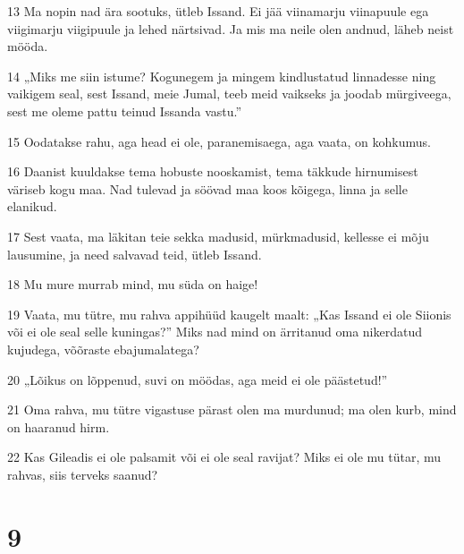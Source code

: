 \par 13 Ma nopin nad ära sootuks, ütleb Issand. Ei jää viinamarju viinapuule ega viigimarju viigipuule ja lehed närtsivad. Ja mis ma neile olen andnud, läheb neist mööda.
\par 14 „Miks me siin istume? Kogunegem ja mingem kindlustatud linnadesse ning vaikigem seal, sest Issand, meie Jumal, teeb meid vaikseks ja joodab mürgiveega, sest me oleme pattu teinud Issanda vastu.”
\par 15 Oodatakse rahu, aga head ei ole, paranemisaega, aga vaata, on kohkumus.
\par 16 Daanist kuuldakse tema hobuste nooskamist, tema täkkude hirnumisest väriseb kogu maa. Nad tulevad ja söövad maa koos kõigega, linna ja selle elanikud.
\par 17 Sest vaata, ma läkitan teie sekka madusid, mürkmadusid, kellesse ei mõju lausumine, ja need salvavad teid, ütleb Issand.
\par 18 Mu mure murrab mind, mu süda on haige!
\par 19 Vaata, mu tütre, mu rahva appihüüd kaugelt maalt: „Kas Issand ei ole Siionis või ei ole seal selle kuningas?” Miks nad mind on ärritanud oma nikerdatud kujudega, võõraste ebajumalatega?
\par 20 „Lõikus on lõppenud, suvi on möödas, aga meid ei ole päästetud!”
\par 21 Oma rahva, mu tütre vigastuse pärast olen ma murdunud; ma olen kurb, mind on haaranud hirm.
\par 22 Kas Gileadis ei ole palsamit või ei ole seal ravijat? Miks ei ole mu tütar, mu rahvas, siis terveks saanud?

\chapter{9}

